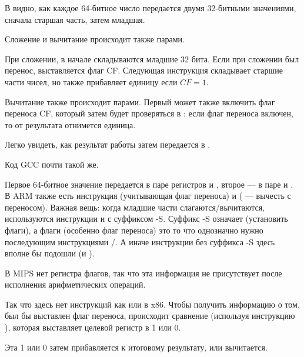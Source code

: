 ﻿






В  видно, как каждое 64-битное число передается двумя 32-битными значениями,
сначала старшая часть, затем младшая.

Сложение и вычитание происходит также парами. 

При сложении, в начале складываются младшие 32 бита.
Если при сложении был перенос, выставляется флаг CF.
Следующая инструкция  складывает старшие части чисел, но также прибавляет единицу если $CF=1$.

Вычитание также происходит парами.
Первый \SUB может также включить флаг переноса CF, который затем будет проверяться в :
если флаг переноса включен, то от результата отнимется единица.

Легко увидеть, как результат работы  затем передается в \printf{}.



Код GCC почти такой же.




Первое 64-битное значение передается в паре регистров  и , второе --- в паре  и .
В ARM также есть инструкция  (учитывающая флаг переноса) и  ( --- вычесть с переносом).
Важная вещь: когда младшие части слагаются/вычитаются, используются инструкции  и  с суффиксом -S.
Суффикс -S означает  (установить флаги), а флаги (особенно флаг переноса) это то что однозначно нужно последующим инструкциями /.
А иначе инструкции без суффикса -S здесь вполне бы подошли (\ADD и \SUB).




В MIPS нет регистра флагов, так что эта информация не присутствует после исполнения арифметических операций.

Так что здесь нет инструкций как  или  в x86.
Чтобы получить информацию о том, был бы выставлен флаг переноса, происходит сравнение (используя инструкцию
), которая выставляет целевой регистр в 1 или 0.

Эта 1 или 0 затем прибавляется к итоговому результату, или вычитается.

